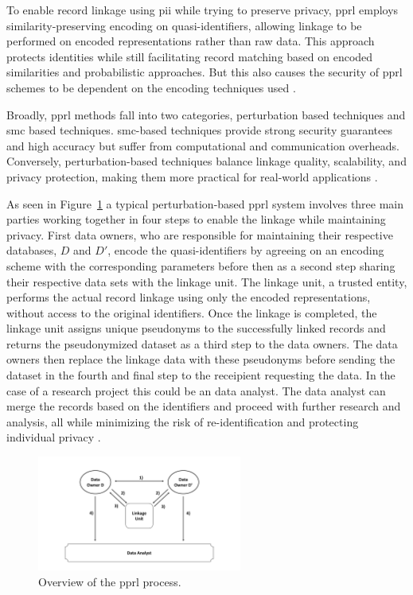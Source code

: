 To enable record linkage using \ac{pii} while trying to preserve privacy, \ac{pprl} employs similarity-preserving encoding on quasi-identifiers, allowing linkage to be performed on encoded representations rather than raw data.
This approach protects identities while still facilitating record matching based on encoded similarities and probabilistic approaches.
But this also causes the security of \ac{pprl} schemes to be dependent on the encoding techniques used \cite{schaefer2024,vidanage2020graph}.


Broadly, \ac{pprl} methods fall into two categories, perturbation based techniques and \ac{smc} based techniques.
\ac{smc}-based techniques provide strong security guarantees and high accuracy but suffer from computational and communication overheads.
Conversely, perturbation-based techniques balance linkage quality, scalability, and privacy protection, making them more practical for real-world applications \cite{vidanage2020graph}.

As seen in Figure~\ref{fig:pprloverview} a typical perturbation-based \ac{pprl} system involves three main parties working together in four steps to enable the linkage while maintaining privacy.
First data owners, who are responsible for maintaining their respective databases, \(D\) and \(D'\), encode the quasi-identifiers by agreeing on an encoding scheme with the corresponding parameters before then as a second step sharing their respective data sets with the linkage unit.
The linkage unit, a trusted entity, performs the actual record linkage using only the encoded representations, without access to the original identifiers.
Once the linkage is completed, the linkage unit assigns unique pseudonyms to the successfully linked records and returns the pseudonymized dataset as a third step to the data owners.
The data owners then replace the linkage data with these pseudonyms before sending the dataset in the fourth and final step to the receipient requesting the data.
In the case of a research project this could be an data analyst.
The data analyst can merge the records based on the identifiers and proceed with further research and analysis, all while minimizing the risk of re-identification and protecting individual privacy \cite{schaefer2024}.

\begin{figure}[H]
  \centering
  \includegraphics[width=0.6\textwidth, page=1]{img/visualization.pdf}
  \caption{Overview of the \ac{pprl} process.}
  \label{fig:pprloverview}
\end{figure}

